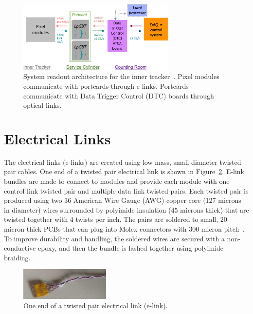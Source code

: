 \documentclass[a4paper,11pt]{article}
\newcommand{\fig}{Figure}
\begin{document}
\begin{figure}[htbp]
\centering
\includegraphics[width=0.70\textwidth,origin=c]{../figures/IT_System_Readout_2-crop.pdf}
\caption{
\label{fig:readout}
System readout architecture for the inner tracker~\cite{ref:orfanelli}. Pixel modules communicate with portcards through e-links. Portcards communicate with Data Trigger Control (DTC) boards through optical links.
}
\end{figure}

\section{Electrical Links}
\label{sec:electrical}


The electrical links (e-links) are created using low mass, small diameter twisted pair cables.
One end of a twisted pair electrical link is shown in \fig~\ref{fig:elink}.
E-link bundles are made to connect to modules and provide each module with one control link twisted pair and multiple data link twisted pairs.
Each twisted pair is produced using two 36 American Wire Gauge (AWG) copper core (127 microns in diameter) wires surrounded by polyimide insulation (45 microns thick) that are twisted together with 4 twists per inch.
The pairs are soldered to small, 20 micron thick PCBs that can plug into Molex connectors with 300 micron pitch~\cite{ref:molex45}.
To improve durability and handling, the soldered wires are secured with a non-conductive epoxy, and then the bundle is lashed together using polyimide braiding.

\begin{figure}[htbp]
\centering
\includegraphics[width=0.4\textwidth,origin=c]{../figures/e-link-1.jpg}
\caption{
\label{fig:elink}
One end of a twisted pair electrical link (e-link).
}
\end{figure}
\end{document}
